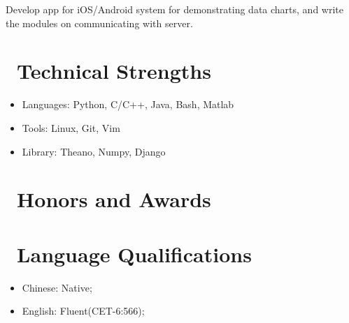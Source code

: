 \documentclass{resume}
\begin{document}
Develop app for iOS/Android system for demonstrating data charts, and write the modules on communicating with server.



\section{\faCogs\ Technical Strengths}
\begin{itemize}[parsep=0.5ex]
  \item Languages: Python, C/C++, Java, Bash, Matlab
  \item Tools: Linux, Git, Vim
  \item Library: Theano, Numpy, Django
\end{itemize}

\section{\faStar\ Honors and Awards}

\section{\faGlobe\ Language Qualifications}
\begin{itemize}[parsep=0.5ex]
  \item Chinese: Native;
  \item English: Fluent(CET-6:566);
\end{itemize}

%
%
\end{document}
